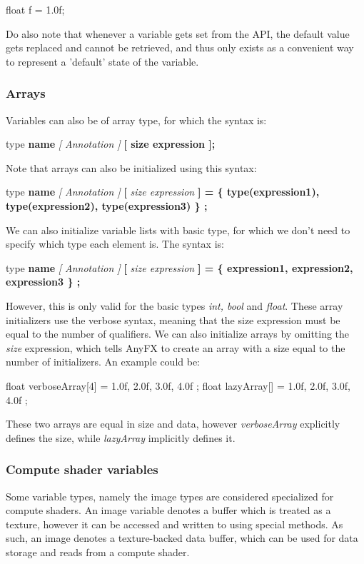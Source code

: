 \documentclass{article}
\newcommand{\SyntaxBox}[1]
{	
	\begin{center}
	\colorbox{orange!60}
	{
		\begin{minipage}{\linewidth}
		\hfill
		\begin{tabbing}
		#1
		\end{tabbing}
		\end{minipage}
	}
	\end{center}
}
\begin{document}
\begin{CodeBox}
	float f = 1.0f;
\end{CodeBox}


Do also note that whenever a variable gets set from the API, the default value gets replaced and cannot be retrieved, and thus only exists as a convenient way to represent a 'default' state of the variable.

\subsubsection{Arrays}
Variables can also be of array type, for which the syntax is:

\SyntaxBox
{
	type \textbf{name} \textit{[ Annotation ]} \textbf{[ size expression ];}
}

Note that arrays can also be initialized using this syntax:

\SyntaxBox
{
	type \textbf{name} \textit{[ Annotation ]} \textbf{[} \textit{size expression} \textbf{] = \{ type(\textbf{expression1}), type(\textbf{expression2}), type(\textbf{expression3}) \} ;}
}

We can also initialize variable lists with basic type, for which we don't need to specify which type each element is. The syntax is:
\SyntaxBox
{
	type \textbf{name} \textit{[ Annotation ]} \textbf{[} \textit{size expression} \textbf{] = \{ \textbf{expression1}, \textbf{expression2}, \textbf{expression3} \} ;}
}

However, this is only valid for the basic types \textit{int, bool} and \textit{float}. These array initializers use the verbose syntax, meaning that the size expression must be equal to the number of qualifiers. We can also initialize arrays by omitting the \textit{size} expression, which tells AnyFX to create an array with a size equal to the number of initializers. An example could be:

\begin{CodeBox}
float verboseArray[4]	= { 1.0f, 2.0f, 3.0f, 4.0f };
float lazyArray[]			= { 1.0f, 2.0f, 3.0f, 4.0f };
\end{CodeBox}

These two arrays are equal in size and data, however \textit{verboseArray} explicitly defines the size, while \textit{lazyArray} implicitly defines it.

\subsubsection{Compute shader variables}
Some variable types, namely the image types are considered specialized for compute shaders. An image variable denotes a buffer which is treated as a texture, however it can be accessed and written to using special methods. As such, an image denotes a texture-backed data buffer, which can be used for data storage and reads from a compute shader.
\end{document}
